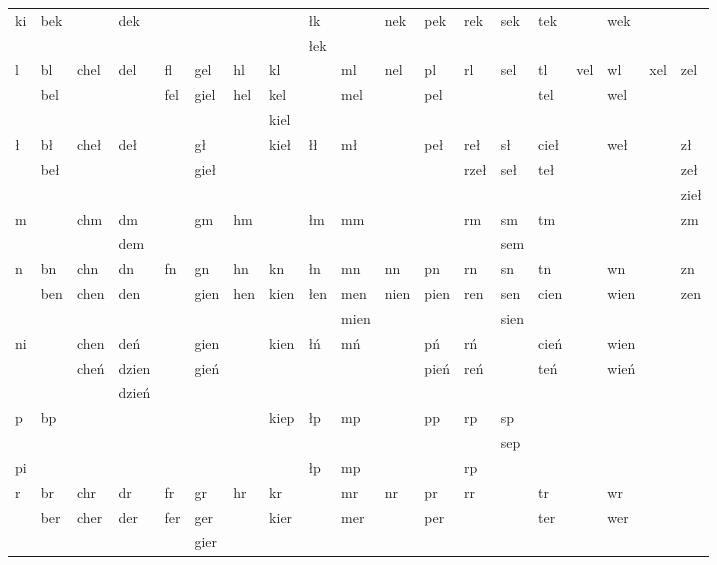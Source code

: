 \documentclass{article}
\begin{document}
\begin{longtable}{p{2mm}|p{2mm}p{4mm}p{2mm}p{1mm}p{3mm}p{2mm}p{3mm}p{2mm}p{4mm}p{3mm}p{3mm}p{2mm}p{2mm}p{2mm}p{1mm}p{1mm}p{1mm}p{4mm}}
\hline
ki & bek &  & dek &  &  &  &  & łk &  & nek & pek & rek & sek & tek &  & wek &  & \\
 &  &  &  &  &  &  &  & łek &  &  &  &  &  &  &  &  &  & \\
\hline
l & bl & chel & del & fl & gel & hl & kl &  & ml & nel & pl & rl & sel & tl & vel & wl & xel & zel\\
 & bel &  &  & fel & giel & hel & kel &  & mel &  & pel &  &  & tel &  & wel &  & \\
 &  &  &  &  &  &  & kiel &  &  &  &  &  &  &  &  &  &  & \\
\hline
ł & bł & cheł & deł &  & gł &  & kieł & łł & mł &  & peł & reł & sł & cieł &  & weł &  & zł\\
 & beł &  &  &  & gieł &  &  &  &  &  &  & rzeł & seł & teł &  &  &  & zeł\\
 &  &  &  &  &  &  &  &  &  &  &  &  &  &  &  &  &  & zieł\\
\hline
m &  & chm & dm &  & gm & hm &  & łm & mm &  &  & rm & sm & tm &  &  &  & zm\\
 &  &  & dem &  &  &  &  &  &  &  &  &  & sem &  &  &  &  & \\
\hline
n & bn & chn & dn & fn & gn & hn & kn & łn & mn & nn & pn & rn & sn & tn &  & wn &  & zn\\
 & ben & chen & den &  & gien & hen & kien & łen & men & nien & pien & ren & sen & cien &  & wien &  & zen\\
 &  &  &  &  &  &  &  &  & mien &  &  &  & sien &  &  &  &  & \\
\hline
ni &  & chen & deń &  & gien &  & kien & łń & mń &  & pń & rń &  & cień &  & wien &  & \\
 &  & cheń & dzien &  & gień &  &  &  &  &  & pień & reń &  & teń &  & wień &  & \\
 &  &  & dzień &  &  &  &  &  &  &  &  &  &  &  &  &  &  & \\
\hline
p & bp &  &  &  &  &  & kiep & łp & mp &  & pp & rp & sp &  &  &  &  & \\
 &  &  &  &  &  &  &  &  &  &  &  &  & sep &  &  &  &  & \\
\hline
pi &  &  &  &  &  &  &  & łp & mp &  &  & rp &  &  &  &  &  & \\
\hline
r & br & chr & dr & fr & gr & hr & kr &  & mr & nr & pr & rr &  & tr &  & wr &  & \\
 & ber & cher & der & fer & ger &  & kier &  & mer &  & per &  &  & ter &  & wer &  & \\
 &  &  &  &  & gier &  &  &  &  &  &  &  &  &  &  &  &  & \\

\end{longtable}
\end{document}
